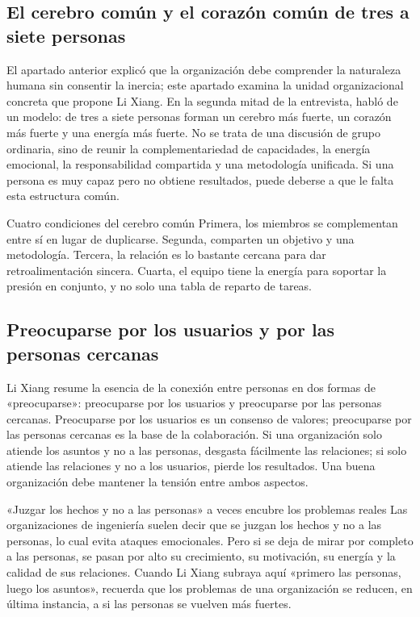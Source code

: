 \documentclass[a4paper]{article}
\begin{document}
\subsection{El cerebro común y el corazón común de tres a siete personas}

El apartado anterior explicó que la organización debe comprender la naturaleza humana sin consentir la inercia; este apartado examina la unidad organizacional concreta que propone Li Xiang. En la segunda mitad de la entrevista, habló de un modelo: de tres a siete personas forman un cerebro más fuerte, un corazón más fuerte y una energía más fuerte. No se trata de una discusión de grupo ordinaria, sino de reunir la complementariedad de capacidades, la energía emocional, la responsabilidad compartida y una metodología unificada. Si una persona es muy capaz pero no obtiene resultados, puede deberse a que le falta esta estructura común.

\begin{importantbox}{Cuatro condiciones del cerebro común}
Primera, los miembros se complementan entre sí en lugar de duplicarse. Segunda, comparten un objetivo y una metodología. Tercera, la relación es lo bastante cercana para dar retroalimentación sincera. Cuarta, el equipo tiene la energía para soportar la presión en conjunto, y no solo una tabla de reparto de tareas.
\end{importantbox}

\subsection{Preocuparse por los usuarios y por las personas cercanas}

Li Xiang resume la esencia de la conexión entre personas en dos formas de «preocuparse»: preocuparse por los usuarios y preocuparse por las personas cercanas. Preocuparse por los usuarios es un consenso de valores; preocuparse por las personas cercanas es la base de la colaboración. Si una organización solo atiende los asuntos y no a las personas, desgasta fácilmente las relaciones; si solo atiende las relaciones y no a los usuarios, pierde los resultados. Una buena organización debe mantener la tensión entre ambos aspectos.

\begin{warningbox}{«Juzgar los hechos y no a las personas» a veces encubre los problemas reales}
Las organizaciones de ingeniería suelen decir que se juzgan los hechos y no a las personas, lo cual evita ataques emocionales. Pero si se deja de mirar por completo a las personas, se pasan por alto su crecimiento, su motivación, su energía y la calidad de sus relaciones. Cuando Li Xiang subraya aquí «primero las personas, luego los asuntos», recuerda que los problemas de una organización se reducen, en última instancia, a si las personas se vuelven más fuertes.
\end{warningbox}
\end{document}
